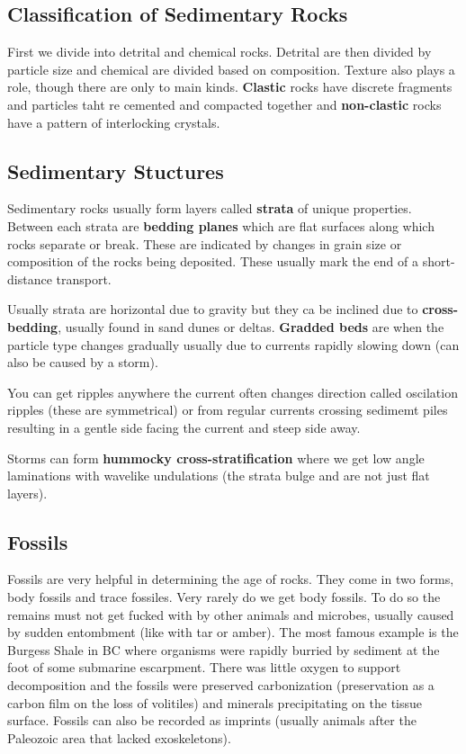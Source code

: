 \documentclass{article}
\begin{document}
\subsection{Classification of Sedimentary Rocks} %
\label{sub:classification_of_sedimentary_rocks}
First we divide into detrital and chemical rocks. Detrital are then divided by particle size and chemical are divided based on composition. Texture also plays a role, though there are only to main kinds. \textbf{Clastic} rocks have discrete fragments and particles taht re cemented and compacted together and \textbf{non-clastic} rocks have a pattern of interlocking crystals.

\subsection{Sedimentary Stuctures} %
\label{sub:sedimentary_stuctures}
Sedimentary rocks usually form layers called \textbf{strata} of unique properties. Between each strata are \textbf{bedding planes} which are flat surfaces along which rocks separate or break. These are indicated by changes in grain size or composition of the rocks being deposited. These usually mark the end of a short-distance transport.

Usually strata are horizontal due to gravity but they ca be inclined due to \textbf{cross-bedding}, usually found in sand dunes or deltas. \textbf{Gradded beds} are when the particle type changes gradually usually due to currents rapidly slowing down (can also be caused by a storm).

You can get ripples anywhere the current often changes direction called oscilation ripples (these are symmetrical) or from  regular currents crossing sedimemt piles resulting in a gentle side facing the current and steep side away.

Storms can form \textbf{hummocky cross-stratification} where we get low angle laminations with wavelike undulations (the strata bulge and are not just flat layers).

\subsection{Fossils} %
\label{sub:fossils}
Fossils are very helpful in determining the age of rocks. They come in two forms, body fossils and trace fossiles. Very rarely do we get body fossils. To do so the remains must not get fucked with by other animals and microbes, usually caused by sudden entombment (like with tar or amber). The most famous example is the Burgess Shale in BC where organisms were rapidly burried by sediment at the foot of some submarine escarpment. There was little oxygen to support decomposition and the fossils were preserved carbonization (preservation as a carbon film on the loss of volitiles) and minerals precipitating on the tissue surface. Fossils can also be recorded as imprints (usually animals after the Paleozoic area that lacked exoskeletons).
\end{document}
